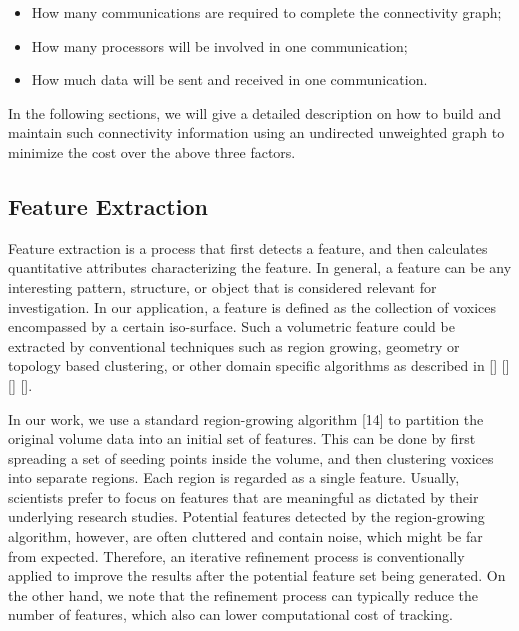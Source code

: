 \documentclass[10pt, conference, compsocconf]{IEEEtran}
\begin{document}
\begin{itemize}
\item How many communications are required to complete the connectivity graph;
\item How many processors will be involved in one communication;
\item How much data will be sent and received in one communication.
\end{itemize}

In the following sections, we will give a detailed description on how to build and maintain such connectivity information using an undirected unweighted graph to minimize the cost over the above three factors.

\subsection{Feature Extraction}
Feature extraction is a process that first detects a feature, and then calculates quantitative attributes characterizing the feature. In general, a feature can be any interesting pattern, structure, or object that is considered relevant for investigation. In our application, a feature is defined as the collection of voxices encompassed by a certain iso-surface. Such a volumetric feature could be extracted by conventional techniques such as region growing, geometry or topology based clustering, or other domain specific algorithms as described in [] [] [] [].

In our work, we use a standard region-growing algorithm [14] to partition the original volume data into an initial set of features. This can be done by first spreading a set of seeding points inside the volume, and then clustering voxices into separate regions. Each region is regarded as a single feature. Usually, scientists prefer to focus on features that are meaningful as dictated by their underlying research studies. Potential features detected by the region-growing algorithm, however, are often cluttered and contain noise, which might be far from expected. Therefore, an iterative refinement process is conventionally applied to improve the results after the potential feature set being generated. On the other hand, we note that the refinement process can typically reduce the number of features, which also can lower computational cost of tracking.
\end{document}
